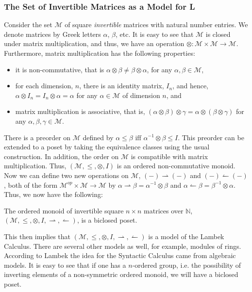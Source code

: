 \documentclass{lmcs}
\let\mto\to                     %
\let\to\relax                   %
\newcommand{\to}{\rightarrow}
\newcommand{\rto}{\leftharpoonup}
\newcommand{\lto}{\rightharpoonup}
\begin{document}
\subsubsection{The Set of Invertible Matrices as a Model for L}
\label{subsec:the_set_of_invertible_matrices}

Consider the set $\mathcal{M}$ of square \textit{invertible} matrices with
natural number entries.  We denote matrices by Greek letters $\alpha$,
$\beta$, etc.  It is easy to see that $\mathcal{M}$ is closed under
matrix multiplication, and thus, we have an operation $\otimes :
\mathcal{M} \times \mathcal{M} \mto \mathcal{M}$.  Furthermore, matrix
multiplication has the following properties:
\begin{itemize}
\item it is non-commutative, that is $\alpha \otimes \beta
  \neq \beta \otimes \alpha$, for any $\alpha,\beta \in \mathcal{M}$,
\item for each dimension, $n$, there is an identity matrix, $I_n$, and hence,
  $\alpha \otimes I_n = I_n \otimes \alpha = \alpha$ for any $\alpha \in
  \mathcal{M}$ of dimension $n$, and
\item matrix multiplication is associative, that is, $(\alpha \otimes
  \beta) \otimes \gamma = \alpha \otimes (\beta \otimes \gamma)$ for any
  $\alpha,\beta,\gamma \in \mathcal{M}$.
\end{itemize}
There is a preorder on $\mathcal{M}$ defined by
$\alpha \leq \beta \text{ iff } \alpha^{-1} \otimes \beta \leq I$.
This preorder can be extended to a poset by taking the equivalence
classes using the usual construction. In addition, the order on
$\mathcal{M}$ is compatible with matrix multiplication.  Thus,
$(\mathcal{M}, \leq, \otimes, I)$ is an ordered non-commutative
monoid.  Now we can define two new operations on $\mathcal{M}$, $(-)
\lto (-)$ and $(-) \rto (-)$, both of the form $\mathcal{M}^{op}
\times \mathcal{M} \mto \mathcal{M}$ by $\alpha \lto \beta =
\alpha^{-1} \otimes \beta$ and $\alpha \rto \beta = \beta^{-1} \otimes
\alpha$.  Thus, we now have the following:
\begin{lem}
  \label{lemma:M-is-biclosed-poset}
  The ordered monoid of invertible square $n \times n$ matrices over
  $\mathbb{N}$, $(\mathcal{M},\leq,\otimes,I,\lto,\rto)$, is a
  biclosed poset.
\end{lem}
This then implies that $(\mathcal{M},\leq,\otimes,I,\lto,\rto)$ is a
model of the Lambek Calculus.  There are several other models as well,
for example, modules of rings.  According to Lambek the idea for the
Syntactic Calculus came from algebraic models.  It is easy to see that
if one has a $n$-ordered group, i.e. the possibility of inverting
elements of a non-symmetric ordered monoid, we will have a biclosed
poset.
\vspace{-10px}
\end{document}
